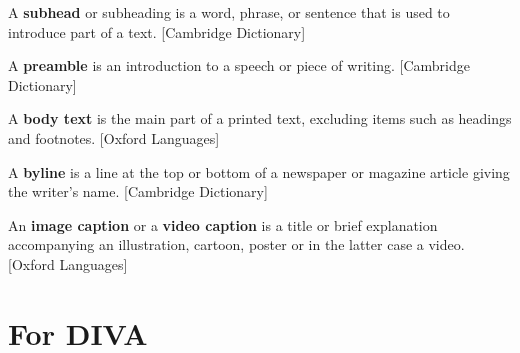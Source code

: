 \documentclass[oneside, english, bibtex]{kththesis}
\begin{document}
\begin{definition}
\label{subhead}
A \textbf{subhead} or subheading is a word, phrase, or sentence that is used to introduce part of a text. [Cambridge Dictionary]
\end{definition}

\begin{definition}
\label{preamble}
A \textbf{preamble} is an introduction to a speech or piece of writing. [Cambridge Dictionary]
\end{definition}

\begin{definition}
\label{body text}
A \textbf{body text} is the main part of a printed text, excluding items such as headings and footnotes. [Oxford Languages]
\end{definition}

\begin{definition}
\label{byline}
A \textbf{byline} is a line at the top or bottom of a newspaper or magazine article giving the writer's name. [Cambridge Dictionary]
\end{definition}

\begin{definition}
\label{img}
An \textbf{image caption} or a \textbf{video caption} is a title or brief explanation accompanying an illustration, cartoon, poster or in the latter case a video. [Oxford Languages]
\end{definition}

\label{pg:lastPageofMainmatter}

\clearpage
\fancyhead{}  %
\section*{For DIVA}
\lstset{numbers=none} %
\end{document}
